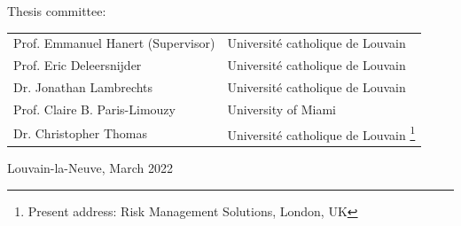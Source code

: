 \vspace*{1.5cm}
\begin{minipage}{\textwidth}
\begin{center}

\large Thesis committee:\\

\vspace*{0.5cm}
\footnotesize{
\hspace{-1cm}
\begin{tabular}{ll}
Prof. Emmanuel Hanert (Supervisor) & Université catholique de Louvain \\
Prof. Eric Deleersnijder           & Université catholique de Louvain \\
Dr. Jonathan Lambrechts            & Université catholique de Louvain\\
Prof. Claire B. Paris-Limouzy      & University of Miami \\
Dr. Christopher Thomas             & Université catholique de Louvain \footnote{Present address: Risk Management Solutions, London, UK}
\end{tabular}
}
\end{center}
\end{minipage}

\vspace*{.5cm}
\begin{minipage}{\textwidth}
\centering
\large Louvain-la-Neuve, March 2022
\end{minipage}
